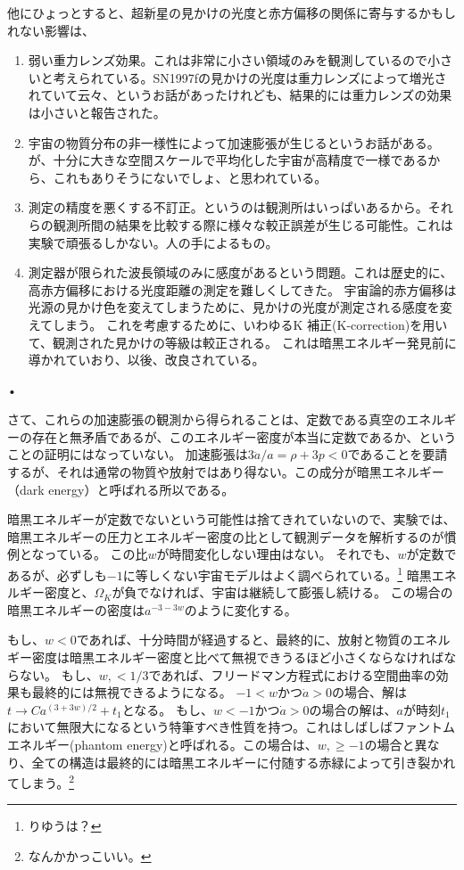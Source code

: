 \documentclass[11pt,a4paper,dvipdfmx]{jsarticle}
\theoremstyle{plain}
\theoremstyle{break}
\begin{document}
他にひょっとすると、超新星の見かけの光度と赤方偏移の関係に寄与するかもしれない影響は、
\begin{enumerate}
\item 弱い重力レンズ効果。これは非常に小さい領域のみを観測しているので小さいと考えられている。SN1997fの見かけの光度は重力レンズによって増光されていて云々、というお話があったけれども、結果的には重力レンズの効果は小さいと報告された。
\item 宇宙の物質分布の非一様性によって加速膨張が生じるというお話がある。が、十分に大きな空間スケールで平均化した宇宙が高精度で一様であるから、これもありそうにないでしょ、と思われている。
\item 測定の精度を悪くする不訂正。というのは観測所はいっぱいあるから。それらの観測所間の結果を比較する際に様々な較正誤差が生じる可能性。これは実験で頑張るしかない。人の手によるもの。
\item 測定器が限られた波長領域のみに感度があるという問題。これは歴史的に、高赤方偏移における光度距離の測定を難しくしてきた。
宇宙論的赤方偏移は光源の見かけ色を変えてしまうために、見かけの光度が測定される感度を変えてしまう。
これを考慮するために、いわゆるK 補正(K-correction)を用いて、観測された見かけの等級は較正される。
これは暗黒エネルギー発見前に導かれていおり、以後、改良されている。
\end{enumerate}•%

さて、これらの加速膨張の観測から得られることは、定数である真空のエネルギーの存在と無矛盾であるが、このエネルギー密度が本当に定数であるか、ということの証明にはなっていない。
加速膨張は$3\ddot{a}/a = \rho + 3 p < 0$であることを要請するが、それは通常の物質や放射ではあり得ない。この成分が暗黒エネルギー（dark energy）と呼ばれる所以である。

暗黒エネルギーが定数でないという可能性は捨てきれていないので、実験では、暗黒エネルギーの圧力とエネルギー密度の比として観測データを解析するのが慣例となっている。
この比$w$が時間変化しない理由はない。
それでも、$w$が定数であるが、必ずしも$-1$に等しくない宇宙モデルはよく調べられている。\footnote{りゆうは？}
暗黒エネルギー密度と、$\Omega_{K}$が負でなければ、宇宙は継続して膨張し続ける。
この場合の暗黒エネルギーの密度は$a^{-3 -3w}$のように変化する。

もし、$w <0$であれば、十分時間が経過すると、最終的に、放射と物質のエネルギー密度は暗黒エネルギー密度と比べて無視できうるほど小さくならなければならない。
もし、$w,<1/3$であれば、フリードマン方程式における空間曲率の効果も最終的には無視できるようになる。
$-1<w$かつ$\dot{a}>0$の場合、解は$t  \to Ca^{(3+3w)/2} + t_1$となる。
もし、$w<-1$かつ$\dot{a}>0$の場合の解は、$a$が時刻$t_1$において無限大になるという特筆すべき性質を持つ。これはしばしばファントムエネルギー(phantom energy)と呼ばれる。この場合は、$w,\geq -1$の場合と異なり、全ての構造は最終的には暗黒エネルギーに付随する赤緑によって引き裂かれてしまう。\footnote{なんかかっこいい。}
\end{document}
